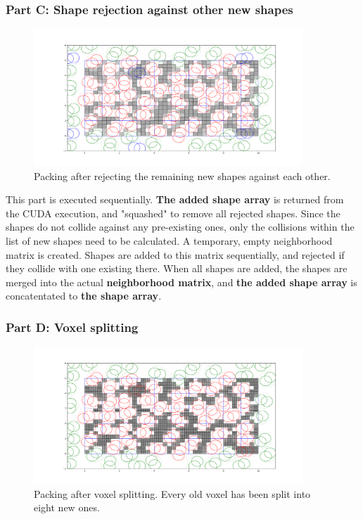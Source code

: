 \documentclass[12pt, oneside]{report}
\begin{document}
\subsubsection{Part C: Shape rejection against other new shapes}

\begin{figure}[H]
  \centering
	\includegraphics[width=0.9\textwidth,keepaspectratio]{Images/GPURSA/Figure_4.pdf}
	\caption{Packing after rejecting the remaining new shapes against each other.}
	\label{GPURSA_Process_4}
\end{figure}

This part is executed sequentially. \newline
\textbf{The added shape array} is returned from the CUDA execution, and "squashed" to remove all rejected shapes. Since the shapes do not collide against any pre-existing ones, only the collisions within the list of new shapes need to be calculated. A temporary, empty neighborhood matrix is created. Shapes are added to this matrix sequentially, and rejected if they collide with one existing there. When all shapes are added, the shapes are merged into the actual \textbf{neighborhood matrix}, and \textbf{the added shape array} is concatentated to \textbf{the shape array}.

\subsubsection{Part D: Voxel splitting}

\begin{figure}[H]
  \centering
	\includegraphics[width=0.9\textwidth,keepaspectratio]{Images/GPURSA/Figure_5.pdf}
	\caption{Packing after voxel splitting. Every old voxel has been split into eight new ones.}
	\label{GPURSA_Process_5}
\end{figure}
\end{document}
